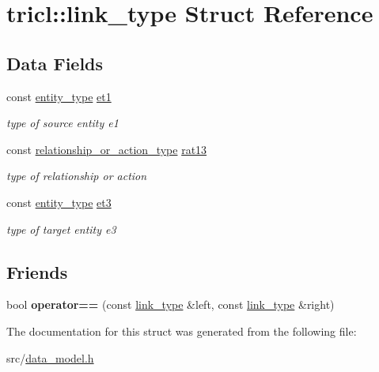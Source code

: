 \hypertarget{structtricl_1_1link__type}{}\section{tricl\+:\+:link\+\_\+type Struct Reference}
\label{structtricl_1_1link__type}
\subsection*{Data Fields}
\begin{DoxyCompactItemize}
\item 
\mbox{\label{structtricl_1_1link__type_a9cb3cda7790fc4d697f6274cf0af708c}} 
const \hyperlink{data__model_8h_afd4de3aedd5e48cf955f03457386e98f}{entity\+\_\+type} \hyperlink{structtricl_1_1link__type_a9cb3cda7790fc4d697f6274cf0af708c}{et1}
\begin{DoxyCompactList}\small\item\em type of source entity e1 \end{DoxyCompactList}\item 
\mbox{\label{structtricl_1_1link__type_ab567b0eff4a068b28141da69c810770d}} 
const \hyperlink{data__model_8h_a2d01894944fb58a8fedc0912a48d13f8}{relationship\+\_\+or\+\_\+action\+\_\+type} \hyperlink{structtricl_1_1link__type_ab567b0eff4a068b28141da69c810770d}{rat13}
\begin{DoxyCompactList}\small\item\em type of relationship or action \end{DoxyCompactList}\item 
\mbox{\label{structtricl_1_1link__type_ae89141e8c4719830d32c0d7fe95a184f}} 
const \hyperlink{data__model_8h_afd4de3aedd5e48cf955f03457386e98f}{entity\+\_\+type} \hyperlink{structtricl_1_1link__type_ae89141e8c4719830d32c0d7fe95a184f}{et3}
\begin{DoxyCompactList}\small\item\em type of target entity e3 \end{DoxyCompactList}\end{DoxyCompactItemize}
\subsection*{Friends}
\begin{DoxyCompactItemize}
\item 
\mbox{\label{structtricl_1_1link__type_ae75460e218908d70af1163248317096e}} 
bool {\bfseries operator==} (const \hyperlink{structtricl_1_1link__type}{link\+\_\+type} \&left, const \hyperlink{structtricl_1_1link__type}{link\+\_\+type} \&right)
\end{DoxyCompactItemize}


The documentation for this struct was generated from the following file\+:\begin{DoxyCompactItemize}
\item 
src/\hyperlink{data__model_8h}{data\+\_\+model.\+h}\end{DoxyCompactItemize}
